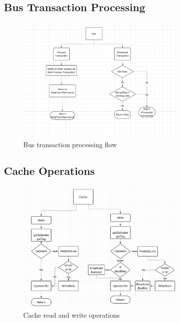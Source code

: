 \documentclass[10pt]{article}
\begin{document}
\subsection{Bus Transaction Processing}
\begin{figure}[H]
    \centering
    \includegraphics[width=0.75\textwidth]{./images/busflow.jpg}
    \caption{Bus transaction processing flow}
\end{figure}

\subsection{Cache Operations}
\begin{figure}[H]
    \centering
    \includegraphics[width=0.75\textwidth]{./Images/cacheflow.jpg}
    \caption{Cache read and write operations}
\end{figure}
\end{document}
